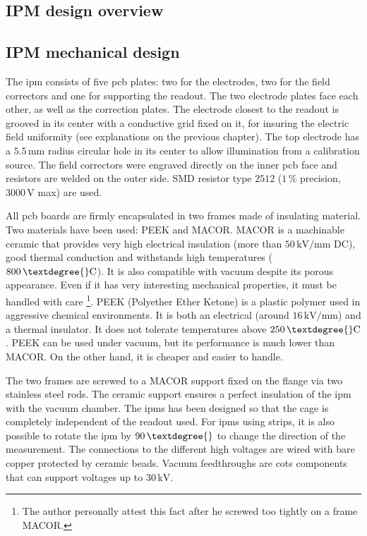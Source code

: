 \begin{refsection}
  \section{IPM design overview}
  \subsection{IPM mechanical design}
  The \acrshort{ipm} consists of five \acrshort{pcb} plates: two for the electrodes, two for the field correctors and one for supporting the readout. The two electrode plates face each other, as well as the correction plates. The electrode closest to the readout is grooved in its center with a conductive grid fixed on it, for insuring the electric field uniformity (see explanations on the previous chapter). The top electrode has a $5.5\,\mathrm{mm}$ radius circular hole in its center to allow illumination from a calibration source. The field correctors were engraved directly on the inner \acrshort{pcb} face and resistors are welded on the outer side. SMD resistor type $2512$ ($1\,\mathrm{\%}$ precision, $3000\,\mathrm{V}$ max) are used.

  All \acrshort{pcb} boards are firmly encapsulated in two frames made of insulating material. Two materials have been used: PEEK and MACOR. MACOR is a machinable ceramic that provides very high electrical insulation (more than $50\,\mathrm{kV/mm}$ DC), good thermal conduction and withstands high temperatures ($800\,\mathrm{\textdegree{}C}$). It is also compatible with vacuum despite its porous appearance. Even if it has very interesting mechanical properties, it must be handled with care \footnote{The author personally attest this fact after he screwed too tightly on a frame MACOR.}. PEEK (Polyether Ether Ketone) is a plastic polymer used in aggressive chemical environments. It is both an electrical (around $16\,\mathrm{kV/mm}$) and a thermal insulator. It does not tolerate temperatures above $250\,\mathrm{\textdegree{}C}$. PEEK can be used under vacuum, but its performance is much lower than MACOR. On the other hand, it is cheaper and easier to handle.

  The two frames are screwed to a MACOR support fixed on the flange via two stainless steel rods. The ceramic support ensures a perfect insulation of the \acrshort{ipm} with the vacuum chamber. The \acrshort{ipm}s has been designed so that the cage is completely independent of the readout used. For \acrshort{ipm}s using strips, it is also possible to rotate the \acrshort{ipm} by $90\,\textdegree{}$ to change the direction of the measurement. The connections to the different high voltages are wired with bare copper protected by ceramic beads. Vacuum feedthroughs are \acrfull{cots} components that can support voltages up to $30\,\mathrm{kV}$.


\end{refsection}

